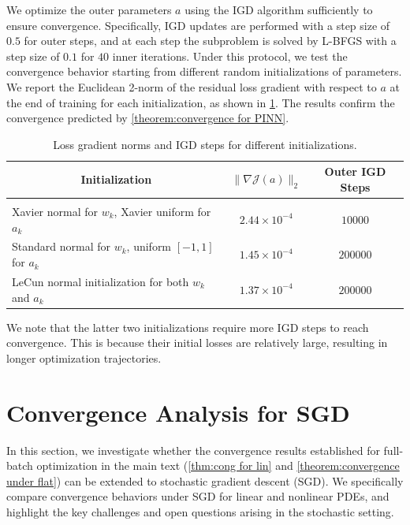 \documentclass{article}
\begin{document}
We optimize the outer parameters $a$ using the IGD algorithm sufficiently to ensure convergence.
Specifically, IGD updates are performed with a step size of $0.5$ for outer steps, and at each step the subproblem is solved by L-BFGS with a step size of $0.1$ for $40$ inner iterations.
Under this protocol, we test the convergence behavior starting from different random initializations of parameters. 
We report the Euclidean 2-norm of the residual loss gradient with respect to $a$ at the end of training for each initialization, as shown in \cref{tab:interior_loss_grad1}. 
The results confirm the convergence predicted by \cref{theorem:convergence for PINN}.
\begin{table}[h]
\caption{Loss gradient norms and IGD steps for different initializations.}
\label{tab:interior_loss_grad1}
\begin{center}
\begin{tabular}{lcc}
\multicolumn{1}{c}{\bf Initialization} & \multicolumn{1}{c}{$\|\nabla \mathcal{J}(a)\|_2$} & \multicolumn{1}{c}{\bf Outer IGD Steps} \\
\hline \\
Xavier normal for $w_k$, Xavier uniform for $a_k$    & $2.44 \times 10^{-4}$ & $10000$ \\
Standard normal for $w_k$, uniform $[-1,1]$ for $a_k$ & $1.45 \times 10^{-4}$ & $200000$ \\
LeCun normal initialization for both $w_k$ and $a_k$ & $1.37 \times 10^{-4}$ & $200000$ \\
\end{tabular}
\end{center}
\end{table}

We note that the latter two initializations require more IGD steps to reach convergence. This is because their initial losses are relatively large, resulting in longer optimization trajectories.



\section{Convergence Analysis for SGD}\label{sec:sgd analysis}

In this section, we investigate whether the convergence results established for full-batch optimization in the main text (\cref{thm:cong for lin} and \cref{theorem:convergence under flat}) can be extended to stochastic gradient descent (SGD). 
We specifically compare convergence behaviors under SGD for linear and nonlinear PDEs, and highlight the key challenges and open questions arising in the stochastic setting.
\end{document}
